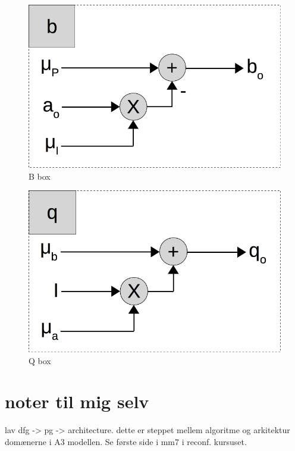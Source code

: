 \begin{figure}[ht!]
  \centering
  \includegraphics[scale=0.3]{figures/b_par}
  \caption{B box}
  \label{fig:b_par}
\end{figure}

\begin{figure}[ht!]
  \centering
  \includegraphics[scale=0.3]{figures/q_par}
  \caption{Q box}
  \label{fig:q_par}
\end{figure}

\color{gray}
\section*{noter til mig selv}
lav dfg -> pg -> architecture. dette er steppet mellem algoritme og arkitektur domænerne i A3 modellen. Se første side i mm7 i reconf. kursuset. \\ 


